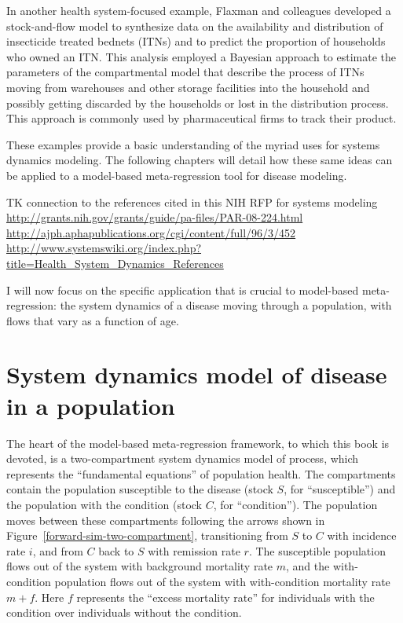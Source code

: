 In another health system-focused example, Flaxman and colleagues
developed a stock-and-flow model to synthesize data on the
availability and distribution of insecticide treated bednets (ITNs)
and to predict the proportion of households who owned an ITN. This
analysis employed a Bayesian approach to estimate the parameters of
the compartmental model that describe the process of ITNs moving from
warehouses and other storage facilities into the household and
possibly getting discarded by the households or lost in the
distribution process.  This approach is commonly used by
pharmaceutical firms to track their product.

These examples provide a basic understanding of the myriad uses for
systems dynamics modeling. The following chapters will detail how
these same ideas can be applied to a model-based meta-regression tool
for disease modeling.




TK connection to the references cited in this NIH RFP for systems modeling
\url{http://grants.nih.gov/grants/guide/pa-files/PAR-08-224.html}
\url{http://ajph.aphapublications.org/cgi/content/full/96/3/452}
\url{http://www.systemswiki.org/index.php?title=Health_System_Dynamics_References}




I will now focus on the specific application that is crucial to
model-based meta-regression: the system dynamics of a disease moving
through a population, with flows that vary as a function of age.

\chapter{System dynamics model of disease in a population}
\label{sys-dynamics}
The heart of the model-based meta-regression framework, to which this
book is devoted, is a two-compartment system dynamics model of
process, which represents the ``fundamental equations'' of population
health. The compartments contain the population susceptible to the
disease (stock $S$, for ``susceptible'') and the population with the
condition (stock $C$, for ``condition''). The population moves between
these compartments following the arrows shown in
Figure~\ref{forward-sim-two-compartment}, transitioning from $S$ to
$C$ with incidence rate $i$, and from $C$ back to $S$ with remission
rate $r$. The susceptible population flows out of the system with
background mortality rate $m$, and the with-condition
population flows out of the system with with-condition mortality rate
$m+f$.  Here $f$ represents the ``excess mortality rate'' for
individuals with the condition over individuals without the condition.

